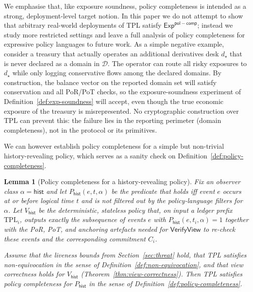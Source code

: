 \documentclass[11pt]{article}
\newtheorem{lemma}{Lemma}
\begin{document}
We emphasise that, like exposure soundness, policy completeness is intended as a strong, deployment-level target notion.
In this paper we do not attempt to show that arbitrary real-world deployments of TPL satisfy
$\mathsf{Exp}^{\mathsf{pol-comp}}$; instead we study more restricted settings and leave a full analysis of
policy completeness for expressive policy languages to future work.
As a simple negative example, consider a treasury that actually operates an additional derivatives desk $d_\star$ that is never declared as a domain in $\mathcal{D}$.
The operator can route all risky exposures to $d_\star$ while only logging conservative flows among the declared domains.
By construction, the balance vector on the reported domain set will satisfy conservation and all PoR/PoT checks, so the exposure-soundness experiment of Definition~\ref{def:exp-soundness} will accept, even though the true economic exposure of the treasury is misrepresented.
No cryptographic construction over TPL can prevent this: the failure lies in the reporting perimeter (domain completeness), not in the protocol or its primitives.

We can however establish policy completeness for a simple but non-trivial history-revealing policy, which serves as a sanity check on Definition~\ref{def:policy-completeness}.

\begin{lemma}[Policy completeness for a history-revealing policy]
\label{lem:policy-completeness-history}
Fix an observer class $\alpha = \mathsf{hist}$ and let $P_{\mathsf{hist}}(e,t,\alpha)$ be the predicate that holds
iff event $e$ occurs at or before logical time $t$ and is not filtered out by the policy-language filters for~$\alpha$.
Let $V_{\mathsf{hist}}$ be the deterministic, stateless policy that, on input a ledger prefix $\mathrm{TPL}_i$, outputs
exactly the subsequence of events $e$ with $P_{\mathsf{hist}}(e,t_i,\alpha)=1$ together with the PoR, PoT, and anchoring
artefacts needed for $\mathsf{VerifyView}$ to re-check these events and the corresponding commitment $C_i$.

Assume that the liveness bounds from Section~\ref{sec:threat} hold, that TPL satisfies non-equivocation in the sense of
Definition~\ref{def:non-equivocation}, and that view correctness holds for $V_{\mathsf{hist}}$
(Theorem~\ref{thm:view-correctness}).
Then TPL satisfies policy completeness for $P_{\mathsf{hist}}$ in the sense of Definition~\ref{def:policy-completeness}.
\end{lemma}
\end{document}
